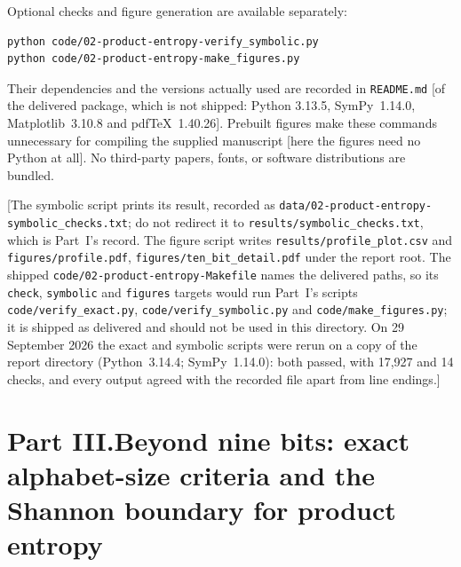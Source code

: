 \documentclass[11pt]{article}
\numberwithin{equation}{section}
\theoremstyle{definition}
\theoremstyle{remark}
\begin{document}
Optional checks and figure generation are available separately:
\begin{verbatim}
python code/02-product-entropy-verify_symbolic.py
python code/02-product-entropy-make_figures.py
\end{verbatim}
Their dependencies and the versions actually used are recorded in
\texttt{README.md} [of the delivered package, which is not shipped: Python
3.13.5, SymPy~1.14.0, Matplotlib~3.10.8 and pdfTeX~1.40.26]. Prebuilt
figures make these commands unnecessary for compiling the supplied
manuscript [here the figures need no Python at all]. No third-party
papers, fonts, or software distributions are bundled.

[The symbolic script prints its result, recorded as
\nolinkurl{data/02-product-entropy-symbolic_checks.txt}; do not redirect
it to \nolinkurl{results/symbolic_checks.txt}, which is Part~I's record.
The figure script writes \nolinkurl{results/profile_plot.csv} and
\nolinkurl{figures/profile.pdf}, \nolinkurl{figures/ten_bit_detail.pdf}
under the report root. The shipped
\nolinkurl{code/02-product-entropy-Makefile} names the delivered paths, so
its \texttt{check}, \texttt{symbolic} and \texttt{figures} targets would
run Part~I's scripts \nolinkurl{code/verify_exact.py},
\nolinkurl{code/verify_symbolic.py} and \nolinkurl{code/make_figures.py};
it is shipped as delivered and should not be used in this directory. On
29 September 2026 the exact and symbolic scripts were rerun on a copy of
the report directory (Python~3.14.4; SymPy~1.14.0): both passed, with
17,927 and 14 checks, and every output agreed with the recorded file
apart from line endings.]

\clearpage
{}
\part*{Part III.\quad Beyond nine bits: exact alphabet-size criteria and the Shannon boundary for product entropy}
\end{document}
